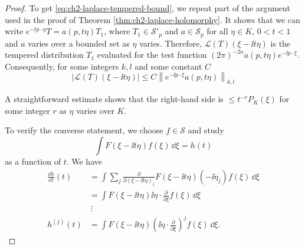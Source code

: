 \begin{proof}
To get \eqref{eq:ch2-laplace-tempered-bound}, we repeat part of the argument used in the proof of
Theorem \ref{thm:ch2-laplace-holomorphy}.  It shows that we can write
$e^{-tp\cdot\eta}T=a(p,t\eta)T_1$, where $T_1\in\mathcal{S}'_p$ and
$a\in\mathcal{S}_p$ for all $\eta\in K$, $0<t<1$ and $a$ varies over a
bounded set as $\eta$ varies.  Therefore, $\mathcal{L}(T)(\xi-\ii t\eta)$ is
the tempered distribution $T_1$ evaluated for the test function
$(2\pi)^{-2n}a(p,t\eta)e^{-\ii p\cdot\xi}$.  Consequently, for some integers
$k,l$ and some constant $C$
\begin{equation}
  |\mathcal{L}(T)(\xi-\ii t\eta)|
  \leq C\left\|e^{-\ii p\cdot\xi}a(p,t\eta)\right\|_{k,l}
  \tag{2-81}\label{eq:ch2-laplace-tempered-seminorm}
\end{equation}

A straightforward estimate shows that the right-hand side is $\leq
t^{-r}P_K(\xi)$ for some integer $r$ as $\eta$ varies over $K$.

To verify the converse statement, we choose $f\in\mathcal{S}$ and study
\begin{equation*}
  \int F(\xi-\ii t\eta)f(\xi)\,\dd\xi=h(t)
\end{equation*}
as a function of $t$.  We have
\begin{align*}
  \frac{\dd h}{\dd t}(t)
  &=\int\sum_j\frac{\partial}{\partial(\xi-\ii t\eta)_j}
    F(\xi-\ii t\eta)(-\ii\eta_j)f(\xi)\,\dd\xi \\
  &=\int F(\xi-\ii t\eta)\ii\eta\mathbin{\cdot}
    \frac{\partial}{\partial\xi}f(\xi)\,\dd\xi \\
  &\ \vdots \\
  h^{(j)}(t)
  &=\int F(\xi-\ii t\eta)
    \left(\ii\eta\mathbin{\cdot}\frac{\partial}{\partial\xi}\right)^j
    f(\xi)\,\dd\xi .
\end{align*}


\end{proof}
